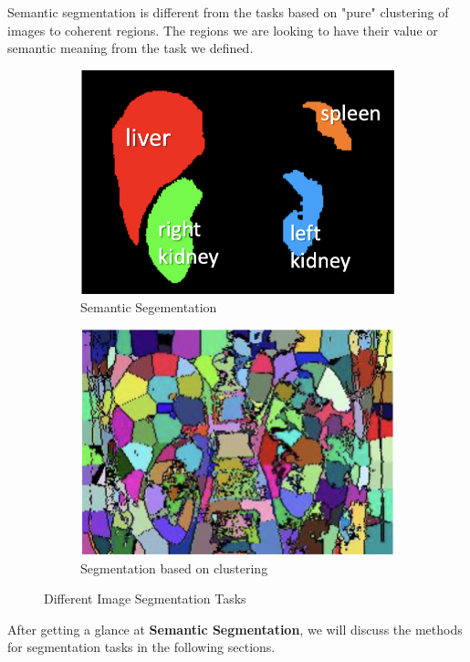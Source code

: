 \begin{note}
    Semantic segmentation is different from the tasks based on "pure" clustering of images to coherent regions. The regions we are looking to have their value or semantic meaning from the task we defined.
\end{note}
\begin{figure}[H]
    \centering
    \begin{subfigure}[b]{0.47\textwidth}
        \centering
        \includegraphics[width=\textwidth]{./figures/semantic-segmentation.png}
        \caption{Semantic Segementation}
        \label{fig:semantic-segmentation}
    \end{subfigure}
    \hfill
    \begin{subfigure}[b]{0.47\textwidth}
        \centering
        \includegraphics[width=\textwidth]{./figures/clustering.png}
        \caption{Segmentation based on clustering}
        \label{fig:normal-segmentation}
    \end{subfigure}
       \caption{Different Image Segmentation Tasks}
       \label{fig:segmentations}
\end{figure}
\noindent After getting a glance at \textbf{Semantic Segmentation}, we will discuss the methods for segmentation tasks in the following sections.
